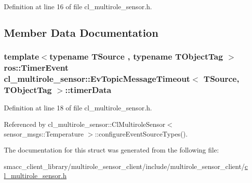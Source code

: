 Definition at line 16 of file cl\+\_\+multirole\+\_\+sensor.\+h.



\subsection{Member Data Documentation}
\subsubsection[{\texorpdfstring{timer\+Data}{timerData}}]{\setlength{\rightskip}{0pt plus 5cm}template$<$typename T\+Source , typename T\+Object\+Tag $>$ ros\+::\+Timer\+Event {\bf cl\+\_\+multirole\+\_\+sensor\+::\+Ev\+Topic\+Message\+Timeout}$<$ T\+Source, T\+Object\+Tag $>$\+::timer\+Data}\hypertarget{structcl__multirole__sensor_1_1EvTopicMessageTimeout_af4d418aeb793c180ee0becc2dec0dc34}{}\label{structcl__multirole__sensor_1_1EvTopicMessageTimeout_af4d418aeb793c180ee0becc2dec0dc34}


Definition at line 18 of file cl\+\_\+multirole\+\_\+sensor.\+h.



Referenced by cl\+\_\+multirole\+\_\+sensor\+::\+Cl\+Multirole\+Sensor$<$ sensor\+\_\+msgs\+::\+Temperature $>$\+::configure\+Event\+Source\+Types().



The documentation for this struct was generated from the following file\+:\begin{DoxyCompactItemize}
\item 
smacc\+\_\+client\+\_\+library/multirole\+\_\+sensor\+\_\+client/include/multirole\+\_\+sensor\+\_\+client/\hyperlink{cl__multirole__sensor_8h}{cl\+\_\+multirole\+\_\+sensor.\+h}\end{DoxyCompactItemize}
